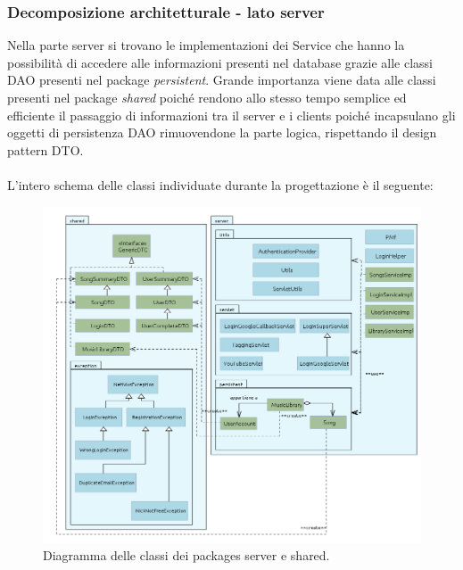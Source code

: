 \subsubsection{Decomposizione architetturale - lato server}
Nella parte server si trovano le implementazioni dei Service che hanno
la possibilit\`a di accedere alle informazioni presenti nel database grazie alle
classi DAO presenti nel package \emph{persistent}.
Grande importanza viene data alle classi presenti nel package \emph{shared}
poich\'e rendono allo stesso tempo semplice ed efficiente il passaggio di
informazioni tra il server e i clients poich\'e incapsulano gli oggetti di
persistenza DAO rimuovendone la parte logica, rispettando il design pattern DTO.
\\\\ L'intero schema delle classi
individuate durante la progettazione \`e il seguente: 
\begin{figure}[h]
  \centering
  \includegraphics[width=16.5cm]{img/ST/Server&Shared.png}
\caption{Diagramma delle classi dei packages server e shared.}
\end{figure}

